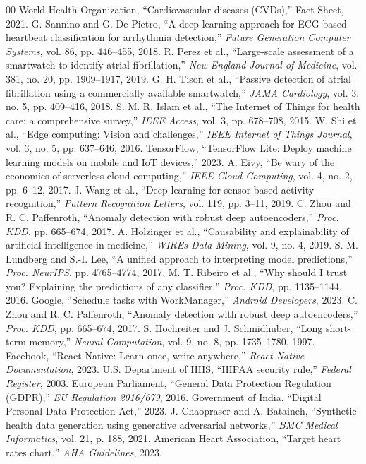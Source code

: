 \documentclass[conference]{IEEEtran}
\begin{document}
\begin{thebibliography}{00}
 World Health Organization, ``Cardiovascular diseases (CVDs),'' Fact Sheet, 2021.
 G. Sannino and G. De Pietro, ``A deep learning approach for ECG-based heartbeat classification for arrhythmia detection,'' \textit{Future Generation Computer Systems}, vol. 86, pp. 446--455, 2018.
 R. Perez et al., ``Large-scale assessment of a smartwatch to identify atrial fibrillation,'' \textit{New England Journal of Medicine}, vol. 381, no. 20, pp. 1909--1917, 2019.
 G. H. Tison et al., ``Passive detection of atrial fibrillation using a commercially available smartwatch,'' \textit{JAMA Cardiology}, vol. 3, no. 5, pp. 409--416, 2018.
 S. M. R. Islam et al., ``The Internet of Things for health care: a comprehensive survey,'' \textit{IEEE Access}, vol. 3, pp. 678--708, 2015.
 W. Shi et al., ``Edge computing: Vision and challenges,'' \textit{IEEE Internet of Things Journal}, vol. 3, no. 5, pp. 637--646, 2016.
 TensorFlow, ``TensorFlow Lite: Deploy machine learning models on mobile and IoT devices,'' 2023.
 A. Eivy, ``Be wary of the economics of serverless cloud computing,'' \textit{IEEE Cloud Computing}, vol. 4, no. 2, pp. 6--12, 2017.
 J. Wang et al., ``Deep learning for sensor-based activity recognition,'' \textit{Pattern Recognition Letters}, vol. 119, pp. 3--11, 2019.
 C. Zhou and R. C. Paffenroth, ``Anomaly detection with robust deep autoencoders,'' \textit{Proc. KDD}, pp. 665--674, 2017.
 A. Holzinger et al., ``Causability and explainability of artificial intelligence in medicine,'' \textit{WIREs Data Mining}, vol. 9, no. 4, 2019.
 S. M. Lundberg and S.-I. Lee, ``A unified approach to interpreting model predictions,'' \textit{Proc. NeurIPS}, pp. 4765--4774, 2017.
 M. T. Ribeiro et al., ``Why should I trust you? Explaining the predictions of any classifier,'' \textit{Proc. KDD}, pp. 1135--1144, 2016.
 Google, ``Schedule tasks with WorkManager,'' \textit{Android Developers}, 2023.
 C. Zhou and R. C. Paffenroth, ``Anomaly detection with robust deep autoencoders,'' \textit{Proc. KDD}, pp. 665--674, 2017.
 S. Hochreiter and J. Schmidhuber, ``Long short-term memory,'' \textit{Neural Computation}, vol. 9, no. 8, pp. 1735--1780, 1997.
 Facebook, ``React Native: Learn once, write anywhere,'' \textit{React Native Documentation}, 2023.
 U.S. Department of HHS, ``HIPAA security rule,'' \textit{Federal Register}, 2003.
 European Parliament, ``General Data Protection Regulation (GDPR),'' \textit{EU Regulation 2016/679}, 2016.
 Government of India, ``Digital Personal Data Protection Act,'' 2023.
 J. Chaopraser and A. Bataineh, ``Synthetic health data generation using generative adversarial networks,'' \textit{BMC Medical Informatics}, vol. 21, p. 188, 2021.
 American Heart Association, ``Target heart rates chart,'' \textit{AHA Guidelines}, 2023.
\end{thebibliography}
\end{document}
